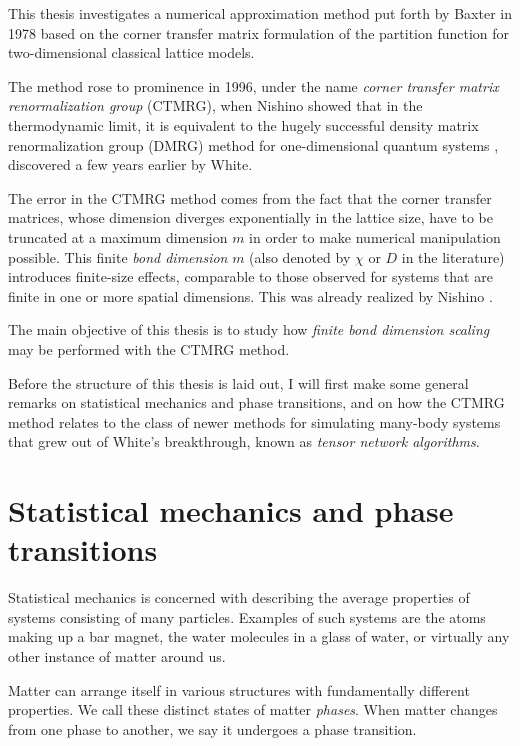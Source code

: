 This thesis investigates a numerical approximation method put forth by
Baxter in 1978 \cite{baxter1978variational, baxter1982exactly_ctm,
tsang1979square} based on the corner transfer matrix formulation of the
partition function for two-dimensional classical lattice models.

The method rose to prominence in 1996, under the name \emph{corner
transfer matrix renormalization group} (CTMRG), when Nishino showed
\cite{nishino1996corner} that in the thermodynamic limit, it is equivalent
to the hugely successful density matrix renormalization group (DMRG)
method for one-dimensional quantum systems \cite{white1992density},
discovered a few years earlier by White.

The error in the CTMRG method comes from the fact that the corner transfer
matrices, whose dimension diverges exponentially in the lattice size, have
to be truncated at a maximum dimension $m$ in order to make numerical
manipulation possible. This finite \emph{bond dimension} $m$ (also denoted
by $\chi$ or $D$ in the literature) introduces
finite-size effects, comparable to those observed for systems that are
finite in one or more spatial dimensions. This was already realized by
Nishino \cite{nishino1996numerical}.

The main objective of this thesis is to study how \emph{finite bond
dimension scaling} may be performed with the CTMRG method.

Before the structure of this thesis is laid out, I will first make some
general remarks on statistical mechanics and phase transitions, and on how
the CTMRG method relates to the class of newer methods for simulating
many-body systems that grew out of White's breakthrough, known as
\emph{tensor network algorithms}.

\section{Statistical mechanics and phase transitions}

Statistical mechanics is concerned with describing the average properties
of systems consisting of many particles. Examples of such systems are the
atoms making up a bar magnet, the water molecules in a glass of water, or
virtually any other instance of matter around us.

Matter can arrange itself in various structures with fundamentally
different properties. We call these distinct states of matter
\emph{phases}. When matter changes from one phase to another, we say it
undergoes a phase transition.

